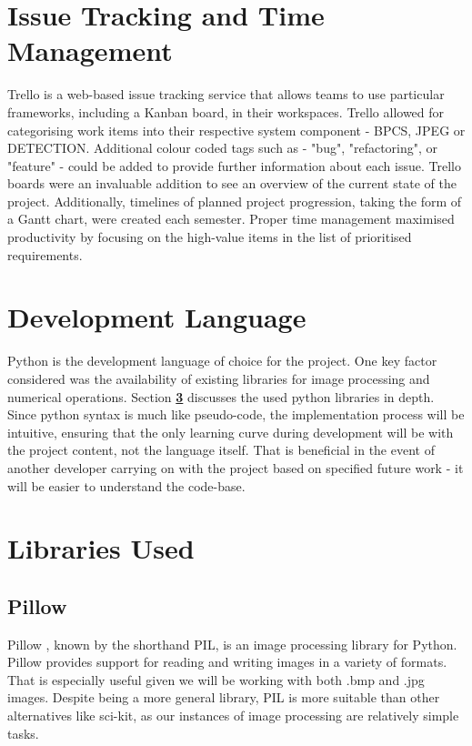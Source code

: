\documentclass{l4proj}
\begin{document}
\section{Issue Tracking and Time Management} \label{issue_tracking}

Trello \citep{trello} is a web-based issue tracking service that allows teams to use particular frameworks, including a Kanban board, in their workspaces. Trello allowed for categorising work items into their respective system component - BPCS, JPEG or DETECTION. Additional colour coded tags such as - "bug", "refactoring", or "feature" - could be added to provide further information about each issue. Trello boards were an invaluable addition to see an overview of the current state of the project. Additionally, timelines of planned project progression, taking the form of a Gantt chart, were created each semester. Proper time management maximised productivity by focusing on the high-value items in the list of prioritised requirements.

\section{Development Language}

Python \citep{python} is the development language of choice for the project. One key factor considered was the availability of existing libraries for image processing and numerical operations. Section \textbf{\ref{Libraries}} discusses the used python libraries in depth. Since python syntax is much like pseudo-code, the implementation process will be intuitive, ensuring that the only learning curve during development will be with the project content, not the language itself. That is beneficial in the event of another developer carrying on with the project based on specified future work - it will be easier to understand the code-base.

\section{Libraries Used}\label{Libraries}

\subsection{Pillow}\label{pillow}

Pillow \citep{pillow}, known by the shorthand PIL, is an image processing library for Python. Pillow provides support for reading and writing images in a variety of formats. That is especially useful given we will be working with both .bmp and .jpg images. Despite being a more general library, PIL is more suitable than other alternatives like sci-kit, as our instances of image processing are relatively simple tasks.
\end{document}
